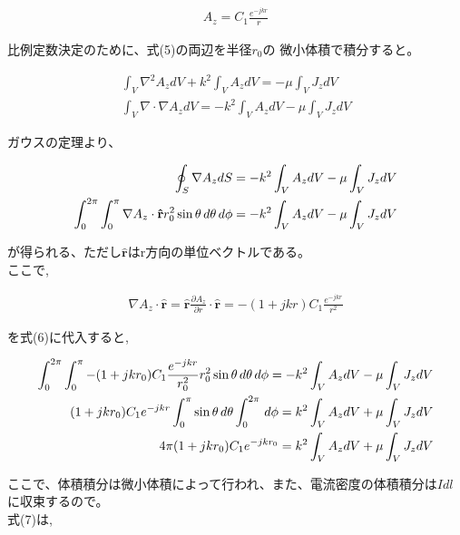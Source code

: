 \documentclass[dvipdfmx,autodetect-engine,titlepage]{jsarticle}
\begin{document}
\begin{align*}
  A_z = C_1 \frac{e^{-jkr}}{r}
\end{align*}

比例定数決定のために、式(5)の両辺を半径\begin{math}r_0\end{math}の
微小体積で積分すると。

\begin{align*}
  \int_{V} \nabla^2 A_z dV + k^2 \int_{V}A_z dV = -\mu\int_{V} J_z dV \\
  \int_{V} \nabla\cdot\nabla A_z dV = -k^2 \int_{V}A_z dV -\mu\int_{V} J_z dV
\end{align*}

ガウスの定理より、

\begin{align}
  \oint_{S}\nabla A_z dS =  -k^2 \int_{V}A_z dV -\mu\int_{V} J_z dV \notag\\
  \int_{0}^{2\pi}\int_{0}^{\pi} \nabla A_z \cdot \mathbf{\hat{r}}r_{0}^2\sin \theta \,d\theta\,d\phi = -k^2 \int_{V}A_z dV -\mu\int_{V} J_z dV
\end{align}

が得られる、ただし\begin{math}\mathbf{\hat{r}}\end{math}はr方向の単位ベクトルである。\\
ここで,

\begin{align*}
  \nabla A_z \cdot \mathbf{\hat{r}} = \mathbf{\hat{r}} \frac{\partial A_z}{\partial r} \cdot \mathbf{\hat{r}} = -(1+jkr)C_1\frac{e^{-jkr}}{r^2}
\end{align*}

を式(6)に代入すると,

\begin{align}
  \int_{0}^{2\pi}\int_{0}^{\pi} -(1+jkr_0)C_1\frac{e^{-jkr}}{r^{2}_0} r_{0}^2\sin \theta \,d\theta\,d\phi = -k^2 \int_{V}A_z dV -\mu\int_{V} J_z dV\notag\\
  (1+jkr_0)C_1e^{-jkr}\int_{0}^{\pi} \sin \theta \,d\theta \int_{0}^{2\pi}\,d\phi = k^2 \int_{V}A_z dV + \mu\int_{V} J_z dV\notag\\
  4\pi(1+jkr_0)C_1 e^{-jkr_0} = k^2 \int_{V}A_z dV + \mu\int_{V} J_z dV
\end{align}

ここで、体積積分は微小体積によって行われ、また、電流密度の体積積分は\begin{math}Idl\end{math}
に収束するので。\\
式(7)は,
\end{document}
